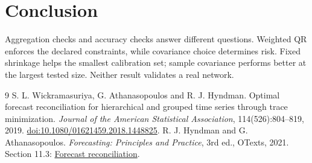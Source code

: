 \documentclass[10pt,a4paper]{article}
\begin{document}
\section{Conclusion}
Aggregation checks and accuracy checks answer different questions. Weighted QR
enforces the declared constraints, while covariance choice determines risk.
Fixed shrinkage helps the smallest calibration set; sample covariance performs
better at the largest tested size. Neither result validates a real network.

\begin{thebibliography}{9}\small
{} S. L. Wickramasuriya, G. Athanasopoulos and R. J. Hyndman.
Optimal forecast reconciliation for hierarchical and grouped time series
through trace minimization. \emph{Journal of the American Statistical Association},
114(526):804--819, 2019. \href{https://doi.org/10.1080/01621459.2018.1448825}{doi:10.1080/01621459.2018.1448825}.
 R. J. Hyndman and G. Athanasopoulos.
\emph{Forecasting: Principles and Practice}, 3rd ed., OTexts, 2021.
Section 11.3: \href{https://otexts.com/fpp3/reconciliation.html}{Forecast reconciliation}.
\end{thebibliography}
\end{document}
